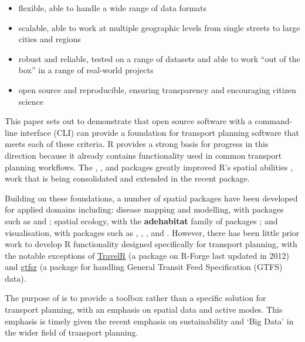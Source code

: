 \begin{itemize}
\tightlist
\item
  flexible, able to handle a wide range of data formats
\item
  scalable, able to work at multiple geographic levels from single streets to large cities and regions
\item
  robust and reliable, tested on a range of datasets and able to work ``out of the box'' in a range of real-world projects
\item
  open source and reproducible, ensuring transparency and encouraging citizen science
\end{itemize}

This paper sets out to demonstrate that open source software with a command-line interface (CLI) can provide a foundation for transport planning software that meets
each of these criteria.
R provides a strong basis for progress in this direction because it already contains functionality used in common transport planning workflows.
The , , and  packages greatly improved R's spatial abilities \citep{bivand_applied_2013}, work that is being consolidated and extended in the recent  package.

Building on these foundations, a number of spatial packages have been developed for applied domains including: disease mapping and modelling, with packages such as  and  \citep{kim_spatialepi:_2016,brown_diseasemapping:_2016}; spatial ecology, with the \textbf{adehabitat} family of packages \citep{calenge_package_2006};
and visualisation, with packages such as , , , and  \citep{RJ-2016-005}.
However, there has been little prior work to develop R functionality designed
specifically for transport planning, with the notable exceptions of
\href{http://r-forge.r-project.org/projects/travelr/}{TravelR} (a package on R-Forge last updated in 2012)
and \href{https://github.com/ropensci/gtfsr}{gtfsr}
(a package for handling  General Transit Feed Specification (GTFS) data).

The purpose of  is to provide a toolbox rather than a specific solution for transport planning, with an emphasis on spatial data and active modes.
This emphasis is timely given the recent emphasis on sustainability \citep{banister_sustainable_2008} and `Big Data' \citep{zheng_big_2016} in the wider field of transport planning.

